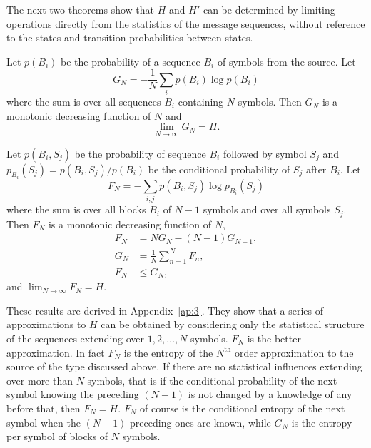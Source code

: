 The next two theorems show that $H$ and $H'$ can be determined by limiting
operations directly from the statistics of the message sequences, without
reference to the states and transition probabilities between states.

\begin{theorem}
\label{thm:5}
Let $p(B_i)$ be the probability of a sequence $B_i$ of symbols from
the source.  Let
$$
G_N = - \frac1N \sum_i p(B_i) \log p(B_i)
$$
where the sum is over all sequences $B_i$ containing $N$ symbols.
Then $G_N$ is a monotonic decreasing function of $N$ and
$$
\lim_{N\to\infty} G_N = H.
$$
\end{theorem}

\begin{theorem}
\label{thm:6}
Let $p(B_i , S_j)$ be the probability of sequence $B_i$ followed by
symbol $S_j$ and $p_{B_i}(S_j) = p(B_i,S_j)/p(B_i)$ be the conditional
probability of $S_j$ after $B_i$.  Let
$$
F_N = - \sum_{i,j} p(B_i,S_j) \log p_{B_i}(S_j)
$$
where the sum is over all blocks $B_i$ of $N-1$ symbols and over all
symbols $S_j$.  Then $F_N$ is a monotonic decreasing function of $N$,
\begin{align*}
F_N &= N G_N - (N-1) G_{N-1}, \\
G_N &= \frac1N \sum_{n=1}^N F_n, \\
F_N &\le G_N,
\end{align*}
and $\lim_{N\to\infty} F_N = H$.
\end{theorem}

These results are derived in Appendix~\ref{ap:3}.  They show that a
series of approximations to $H$ can be obtained by considering only the
statistical structure of the sequences extending over $1,2,\dots,N$
symbols.  $F_N$ is the better approximation.  In fact $F_N$ is the
entropy of the $N^{\text{th}}$ order approximation to the source of the
type discussed above.  If there are no statistical influences extending
over more than $N$ symbols, that is if the conditional probability of the
next symbol knowing the preceding $(N-1)$ is not changed by a knowledge
of any before that, then $F_N = H$.  $F_N$ of course is the conditional
entropy of the next symbol when the $(N-1)$ preceding ones are known,
while $G_N$ is the entropy per symbol of blocks of $N$ symbols.

